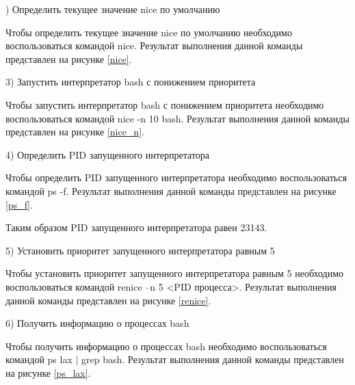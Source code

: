 
) Определить текущее значение nice по умолчанию

Чтобы определить текущее значение nice по умолчанию необходимо воспользоваться командой nice. Результат выполнения данной команды представлен на рисунке \ref{nice}.


3) Запустить интерпретатор bash с понижением приоритета

Чтобы запустить интерпретатор bash с понижением приоритета необходимо воспользоваться командой nice -n 10 bash. Результат выполнения данной команды представлен на рисунке \ref{nice_n}.


4) Определить PID запущенного интерпретатора

Чтобы определить PID запущенного интерпретатора необходимо воспользоваться командой ps -f. Результат выполнения данной команды представлен на рисунке \ref{ps_f}.


Таким образом PID запущенного интерпретатора равен 23143.

5) Установить приоритет запущенного интерпретатора равным 5

Чтобы установить приоритет запущенного интерпретатора равным 5 необходимо воспользоваться командой renice –n  5 <PID процесса>. Результат выполнения данной команды представлен на рисунке \ref{renice}.


6) Получить информацию о процессах bash

Чтобы получить информацию о процессах bash необходимо воспользоваться командой ps lax | grep bash. Результат выполнения данной команды представлен на рисунке \ref{ps_lax}.

